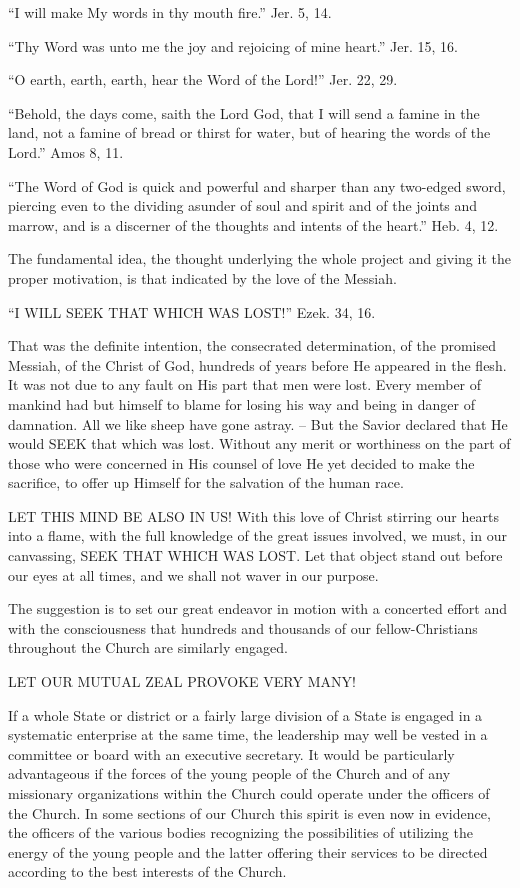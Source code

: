 \documentclass[
]{book}
\begin{document}
``I will make My words in thy mouth fire.'' Jer. 5, 14.

``Thy Word was unto me the joy and rejoicing of mine heart.'' Jer. 15, 16.

``O earth, earth, earth, hear the Word of the Lord!'' Jer. 22, 29.

``Behold, the days come, saith the Lord God, that I will send a famine in the land, not a famine of bread or thirst for water, but of hearing the words of the Lord.'' Amos 8, 11.

``The Word of God is quick and powerful and sharper than any two-edged sword, piercing even to the dividing asunder of soul and spirit and of the joints and marrow, and is a discerner of the thoughts and intents of the heart.'' Heb. 4, 12.

The fundamental idea, the thought underlying the whole project and giving it the proper motivation, is that indicated by the love of the Messiah.

``I WILL SEEK THAT WHICH WAS LOST!'' Ezek. 34, 16.

That was the definite intention, the consecrated determination, of the promised Messiah, of the Christ of God, hundreds of years before He appeared in the flesh. It was not due to any fault on His part that men were lost. Every member of mankind had but himself to blame for losing his way and being in danger of damnation. All we like sheep have gone astray. -- But the Savior declared that He would SEEK that which was lost. Without any merit or worthiness on the part of those who were concerned in His counsel of love He yet decided to make the sacrifice, to offer up Himself for the salvation of the human race.

LET THIS MIND BE ALSO IN US! With this love of Christ stirring our hearts into a flame, with the full knowledge of the great issues involved, we must, in our canvassing, SEEK THAT WHICH WAS LOST. Let that object stand out before our eyes at all times, and we shall not waver in our purpose.

The suggestion is to set our great endeavor in motion with a concerted effort and with the consciousness that hundreds and thousands of our fellow-Christians throughout the Church are similarly engaged.

LET OUR MUTUAL ZEAL PROVOKE VERY MANY!

If a whole State or district or a fairly large division of a State is engaged in a systematic enterprise at the same time, the leadership may well be vested in a committee or board with an executive secretary. It would be particularly advantageous if the forces of the young people of the Church and of any missionary organizations within the Church could operate under the officers of the Church. In some sections of our Church this spirit is even now in evidence, the officers of the various bodies recognizing the possibilities of utilizing the energy of the young people and the latter offering their services to be directed according to the best interests of the Church.
\end{document}
